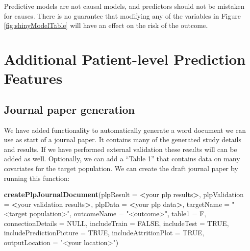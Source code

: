 \documentclass[11pt]{book}
\newenvironment{Shaded}{\begin{snugshade}}{\end{snugshade}}
\newcommand{\DataTypeTok}[1]{\textcolor[rgb]{0.13,0.29,0.53}{#1}}
\newcommand{\KeywordTok}[1]{\textcolor[rgb]{0.13,0.29,0.53}{\textbf{#1}}}
\newcommand{\NormalTok}[1]{#1}
\newcommand{\OperatorTok}[1]{\textcolor[rgb]{0.81,0.36,0.00}{\textbf{#1}}}
\newcommand{\OtherTok}[1]{\textcolor[rgb]{0.56,0.35,0.01}{#1}}
\newcommand{\StringTok}[1]{\textcolor[rgb]{0.31,0.60,0.02}{#1}}
\theoremstyle{definition}
\theoremstyle{definition}
\theoremstyle{definition}
\theoremstyle{remark}
\let\BeginKnitrBlock\begin \let\EndKnitrBlock\end
\begin{document}
\BeginKnitrBlock{rmdimportant}
Predictive models are not causal models, and predictors should not be mistaken for causes. There is no guarantee that modifying any of the variables in Figure \ref{fig:shinyModelTable} will have an effect on the risk of the outcome.
\EndKnitrBlock{rmdimportant}

\hypertarget{additional-patient-level-prediction-features}{%
\section{Additional Patient-level Prediction Features}\label{additional-patient-level-prediction-features}}

\hypertarget{journal-paper-generation}{%
\subsection{Journal paper generation}\label{journal-paper-generation}}

We have added functionality to automatically generate a word document we can use as start of a journal paper. It contains many of the generated study details and results. If we have performed external validation these results will can be added as well. Optionally, we can add a ``Table 1'' that contains data on many covariates for the target population. We can create the draft journal paper by running this function:

\begin{Shaded}
\begin{Highlighting}[]
 \KeywordTok{createPlpJournalDocument}\NormalTok{(}\DataTypeTok{plpResult =} \OperatorTok{<}\NormalTok{your plp results}\OperatorTok{>}\NormalTok{,}
             \DataTypeTok{plpValidation =} \OperatorTok{<}\NormalTok{your validation results}\OperatorTok{>}\NormalTok{,}
             \DataTypeTok{plpData =} \OperatorTok{<}\NormalTok{your plp data}\OperatorTok{>}\NormalTok{,}
             \DataTypeTok{targetName =} \StringTok{"<target population>"}\NormalTok{,}
             \DataTypeTok{outcomeName =} \StringTok{"<outcome>"}\NormalTok{,}
             \DataTypeTok{table1 =}\NormalTok{ F,}
             \DataTypeTok{connectionDetails =} \OtherTok{NULL}\NormalTok{,}
             \DataTypeTok{includeTrain =} \OtherTok{FALSE}\NormalTok{,}
             \DataTypeTok{includeTest =} \OtherTok{TRUE}\NormalTok{,}
             \DataTypeTok{includePredictionPicture =} \OtherTok{TRUE}\NormalTok{,}
             \DataTypeTok{includeAttritionPlot =} \OtherTok{TRUE}\NormalTok{,}
             \DataTypeTok{outputLocation =} \StringTok{"<your location>"}\NormalTok{)}
\end{Highlighting}
\end{Shaded}
\end{document}
